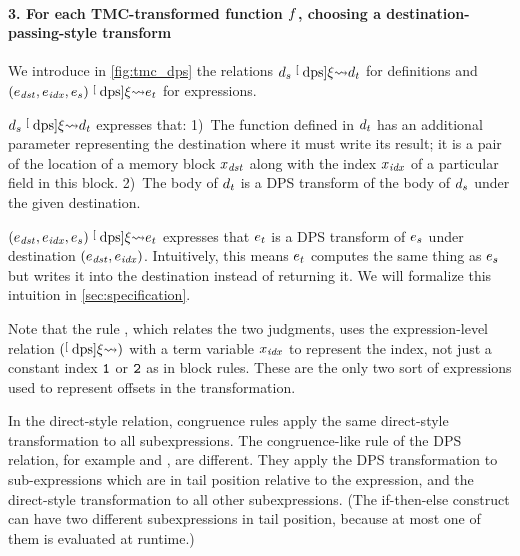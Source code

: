 
\paragraph{3. For each TMC-transformed function $\datalangFn$, choosing a destination-passing-style transform}
We introduce in \cref{fig:tmc_dps} the relations $\datalangDef_s \tmcDps{\datalangRenaming} \datalangDef_t$ for definitions and $(\datalangExpr_\mathit{dst}, \datalangExpr_\mathit{idx}, \datalangExpr_s) \tmcDps{\datalangRenaming} \datalangExpr_t$ for expressions.

$\datalangDef_s \tmcDps{\datalangRenaming} \datalangDef_t$ expresses that:
1)~The function defined in $\datalangDef_t$ has an additional parameter representing the destination where it must write its result; it is a pair of the location of a memory block $\datalangVar_\mathit{dst}$ along with the index $\datalangVar_\mathit{idx}$ of a particular field in this block.
2)~The body of $\datalangDef_t$ is a DPS transform of the body of $\datalangDef_s$ under the given destination.

$(\datalangExpr_\mathit{dst}, \datalangExpr_\mathit{idx}, \datalangExpr_s) \tmcDps{\datalangRenaming} \datalangExpr_t$ expresses that $\datalangExpr_t$ is a DPS transform of $\datalangExpr_s$ under destination $(\datalangExpr_\mathit{dst}, \datalangExpr_\mathit{idx})$.
Intuitively, this means $\datalangExpr_t$ computes the same thing as $\datalangExpr_s$ but writes it into the destination instead of returning it.
We will formalize this intuition in \cref{sec:specification}.

Note that the rule , which relates the two judgments, uses the expression-level relation $(\mathrel{\stackrel[\scriptscriptstyle\textrm{dps}]{ \xi }{ \rightsquigarrow }})$ with a term variable $\datalangVar_\mathit{idx}$ to represent the index, not just a constant index $\texttt{1}$ or $\texttt{2}$ as in block rules. These are the only two sort of expressions used to represent offsets in the transformation.

In the direct-style relation, congruence rules apply the same direct-style transformation to all subexpressions. The congruence-like rule of the DPS relation, for example  and , are different. They apply the DPS transformation to sub-expressions which are in tail position relative to the expression, and the direct-style transformation to all other subexpressions. (The if-then-else construct can have two different subexpressions in tail position, because at most one of them is evaluated at runtime.)

